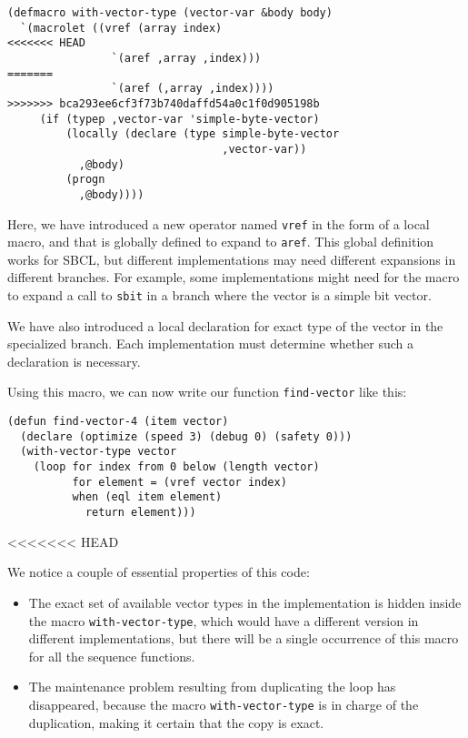 {\small\begin{verbatim}
(defmacro with-vector-type (vector-var &body body)
  `(macrolet ((vref (array index)
<<<<<<< HEAD
                `(aref ,array ,index)))
=======
                `(aref (,array ,index))))
>>>>>>> bca293ee6cf3f73b740daffd54a0c1f0d905198b
     (if (typep ,vector-var 'simple-byte-vector)
         (locally (declare (type simple-byte-vector
                                 ,vector-var))
           ,@body)
         (progn
           ,@body))))
\end{verbatim}}

Here, we have introduced a new operator named \texttt{vref} in the
form of a local macro, and that is globally defined to expand to
\texttt{aref}.  This global definition works for SBCL, but different
implementations may need different expansions in different branches.
For example, some implementations might need for the macro to expand a
call to \texttt{sbit} in a branch where the vector is a simple bit
vector.

We have also introduced a local declaration for exact type of the
vector in the specialized branch.  Each implementation must determine
whether such a declaration is necessary.

Using this macro, we can now write our function \texttt{find-vector}
like this:

{\small\begin{verbatim}
(defun find-vector-4 (item vector)
  (declare (optimize (speed 3) (debug 0) (safety 0)))
  (with-vector-type vector
    (loop for index from 0 below (length vector)
          for element = (vref vector index)
          when (eql item element)
            return element)))
\end{verbatim}}
<<<<<<< HEAD

We notice a couple of essential properties of this code:

\begin{itemize}
\item The exact set of available vector types in the implementation is
  hidden inside the macro \texttt{with-vector-type}, which would have
  a different version in different \commonlisp{} implementations, but
  there will be a single occurrence of this macro for all the sequence
  functions.
\item The maintenance problem resulting from duplicating the loop has
  disappeared, because the macro \texttt{with-vector-type} is in
  charge of the duplication, making it certain that the copy is exact.
\end{itemize}

